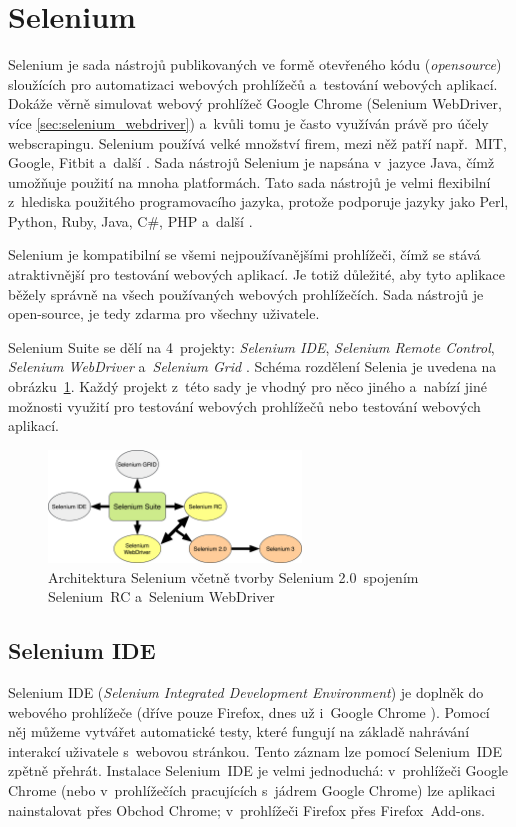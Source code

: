 \section{Selenium}
\label{sec:selenium}
Selenium je sada nástrojů publikovaných ve formě otevřeného kódu (\textit{opensource}) sloužících pro automatizaci webových prohlížečů a~testování webových aplikací. Dokáže věrně simulovat webový prohlížeč Google Chrome (Selenium WebDriver, více \ref{sec:selenium_webdriver}) a~kvůli tomu je často využíván právě pro účely webscrapingu. Selenium používá velké množství firem, mezi něž patří např.~MIT, Google, Fitbit a~další \cite{bib:selenium_automatizace}. Sada nástrojů Selenium je napsána v~jazyce Java, čímž umožňuje použití na mnoha platformách. Tato sada nástrojů je velmi flexibilní z~hlediska použitého programovacího jazyka, protože podporuje jazyky jako Perl, Python, Ruby, Java, C\#, PHP a~další \cite{bib:selenium_automatizace}.

Selenium je kompatibilní se všemi nejpoužívanějšími prohlížeči, čímž se stává atraktivnější pro testování webových aplikací. Je totiž důležité, aby tyto aplikace běžely správně na všech používaných webových prohlížečích. Sada nástrojů je open-source, je tedy zdarma pro všechny uživatele.

Selenium Suite se dělí na 4~projekty: \textit{Selenium IDE}, \textit{Selenium Remote Control}, \textit{Selenium WebDriver} a~\textit{Selenium Grid} \cite{bib:selenium_projekty}. Schéma rozdělení Selenia je uvedena na obrázku~\ref{img:selenium}. Každý projekt z~této sady je vhodný pro něco jiného a~nabízí jiné možnosti využití pro testování webových prohlížečů nebo testování webových aplikací. 

\begin{figure}[hbt]
	\centering
	\includegraphics[width=0.6\textwidth]{images/selenium.png}
	\caption{Architektura Selenium včetně tvorby Selenium 2.0~spojením Selenium~RC a~Selenium WebDriver}
	\label{img:selenium}
\end{figure}

\subsection*{Selenium IDE}
Selenium IDE (\textit{Selenium Integrated Development Environment}) je doplněk do webového prohlížeče (dříve pouze Firefox, dnes už i~Google Chrome \cite{bib:selenium_chrome}). Pomocí něj můžeme vytvářet automatické testy, které fungují na základě nahrávání interakcí uživatele s~webovou stránkou. Tento záznam lze pomocí Selenium~IDE zpětně přehrát. Instalace Selenium~IDE je velmi jednoduchá: v~prohlížeči Google Chrome (nebo v~prohlížečích pracujících s~jádrem Google Chrome) lze aplikaci nainstalovat přes Obchod Chrome; v~prohlížeči Firefox přes Firefox~Add-ons. 

